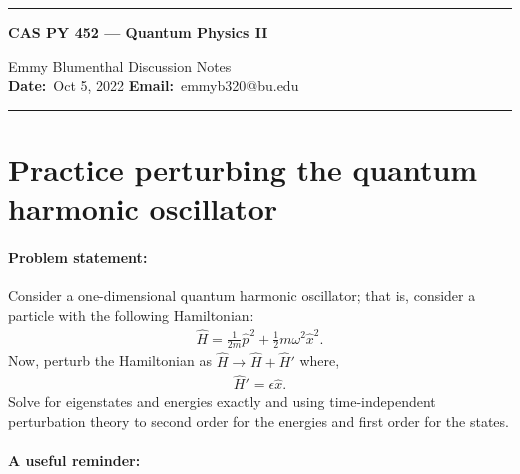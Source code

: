\documentclass[10pt]{article}
\newcommand{\1}{\mathbf 1}
\begin{document}
\begin{center}
	\hrule
	\vspace{.4cm}
	{\textbf { \large CAS PY 452 --- Quantum Physics II}}
\end{center}
Emmy Blumenthal \hspace{\fill} \hspace{\fill}  \textbf{} Discussion Notes\  \\
\textbf{Date:}\  Oct 5, 2022   \hspace{\fill} \textbf{Email:}\ emmyb320@bu.edu \ 
\vspace{.4cm}
\hrule

\section*{Practice perturbing the quantum harmonic oscillator}

\paragraph{Problem statement:}
Consider a one-dimensional quantum harmonic oscillator; that is, consider a particle with the following Hamiltonian:
\begin{align}
	\hat H
	=
	\frac{1}{2m} \hat p^2
	+
	\frac{1}{2} m \omega^2 \hat x^2.
\end{align}
Now, perturb the Hamiltonian as $\hat H \to \hat H + \hat H'$ where,
\begin{align}
	\hat H'
	=
	\epsilon \hat x.
\end{align}
Solve for eigenstates and energies exactly and using time-independent perturbation theory to second order for the energies and first order for the states.

\paragraph{A useful reminder:}
\end{document}

